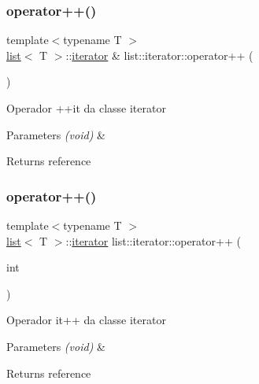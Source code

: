 \subsubsection{\texorpdfstring{operator++()}{operator++()}\hspace{0.1cm}{\footnotesize\ttfamily [1/2]}}
{\footnotesize\ttfamily template$<$typename T $>$ \\
\mbox{\hyperlink{classsc_1_1list}{list}}$<$ T $>$\+::\mbox{\hyperlink{classsc_1_1list_1_1iterator}{iterator}} \& list\+::iterator\+::operator++ (\begin{DoxyParamCaption}{ }\end{DoxyParamCaption})}

Operador ++it da classe iterator 
\begin{DoxyParams}{Parameters}
{\em (void)} & \\
\hline
\end{DoxyParams}
\begin{DoxyReturn}{Returns}
reference 
\end{DoxyReturn}
\mbox{\label{classsc_1_1list_1_1iterator_a07136b928446a99cfb298e631ab0e07e}} 
\subsubsection{\texorpdfstring{operator++()}{operator++()}\hspace{0.1cm}{\footnotesize\ttfamily [2/2]}}
{\footnotesize\ttfamily template$<$typename T $>$ \\
\mbox{\hyperlink{classsc_1_1list}{list}}$<$ T $>$\+::\mbox{\hyperlink{classsc_1_1list_1_1iterator}{iterator}} list\+::iterator\+::operator++ (\begin{DoxyParamCaption}\item[{int}]{ }\end{DoxyParamCaption})}

Operador it++ da classe iterator 
\begin{DoxyParams}{Parameters}
{\em (void)} & \\
\hline
\end{DoxyParams}
\begin{DoxyReturn}{Returns}
reference 
\end{DoxyReturn}
\mbox{\label{classsc_1_1list_1_1iterator_a2780ff54bf392eb23811ca9b7d116908}} 

